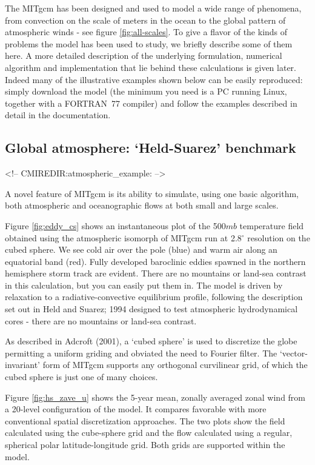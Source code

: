 The MITgcm has been designed and used to model a wide range of phenomena,
from convection on the scale of meters in the ocean to the global pattern of
atmospheric winds - see figure \ref{fig:all-scales}. To give a flavor of the
kinds of problems the model has been used to study, we briefly describe some
of them here. A more detailed description of the underlying formulation,
numerical algorithm and implementation that lie behind these calculations is
given later. Indeed many of the illustrative examples shown below can be
easily reproduced: simply download the model (the minimum you need is a PC
running Linux, together with a FORTRAN\ 77 compiler) and follow the examples
described in detail in the documentation.

\subsection{Global atmosphere: `Held-Suarez' benchmark}
\begin{rawhtml}
<!-- CMIREDIR:atmospheric_example: -->
\end{rawhtml}



A novel feature of MITgcm is its ability to simulate, using one basic algorithm, 
both atmospheric and oceanographic flows at both small and large scales.

Figure \ref{fig:eddy_cs} shows an instantaneous plot of the 500$mb$
temperature field obtained using the atmospheric isomorph of MITgcm run at
2.8$^{\circ }$ resolution on the cubed sphere. We see cold air over the pole
(blue) and warm air along an equatorial band (red). Fully developed
baroclinic eddies spawned in the northern hemisphere storm track are
evident. There are no mountains or land-sea contrast in this calculation,
but you can easily put them in. The model is driven by relaxation to a
radiative-convective equilibrium profile, following the description set out
in Held and Suarez; 1994 designed to test atmospheric hydrodynamical cores -
there are no mountains or land-sea contrast.



As described in Adcroft (2001), a `cubed sphere' is used to discretize the
globe permitting a uniform griding and obviated the need to Fourier filter.
The `vector-invariant' form of MITgcm supports any orthogonal curvilinear
grid, of which the cubed sphere is just one of many choices.

Figure \ref{fig:hs_zave_u} shows the 5-year mean, zonally averaged zonal
wind from a 20-level configuration of
the model. It compares favorable with more conventional spatial
discretization approaches. The two plots show the field calculated using the
cube-sphere grid and the flow calculated using a regular, spherical polar
latitude-longitude grid. Both grids are supported within the model.

